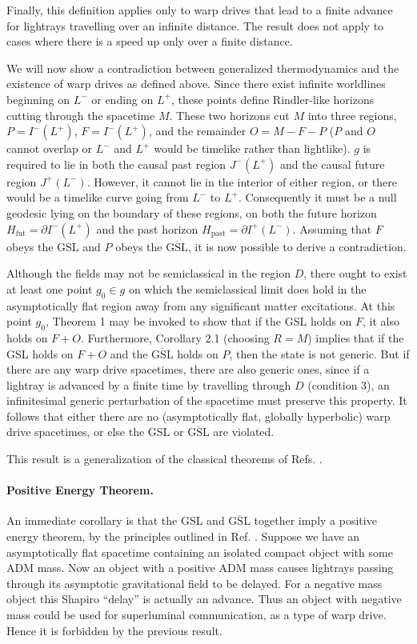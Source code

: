 \documentclass{article}
\begin{document}
Finally, this definition applies only to warp drives that lead to a finite advance for lightrays travelling over an infinite distance.  The result does not apply to cases where there is a speed up only over a finite distance.

We will now show a contradiction between generalized thermodynamics and the existence of warp drives as defined above.  Since there exist infinite worldlines beginning on $L^-$ or ending on $L^+$, these points define Rindler-like horizons cutting through the spacetime $M$.  These two horizons cut $M$ into three regions, $P = I^-(L^+)$, $F = I^-(L^+)$, and the remainder $O = M - F - P$ ($P$ and $O$ cannot overlap or $L^-$ and $L^+$ would be timelike rather than lightlike).  $g$ is required to lie in both the causal past region $J^-(L^+)$ and the causal future region $J^+(L^-)$.  However, it cannot lie in the interior of either region, or there would be a timelike curve going from $L^-$ to $L^+$.  Consequently it must be a null geodesic lying on the boundary of these regions, on both the future horizon $H_\mathrm{fut} = \partial I^-(L^+)$ and the past horizon $H_\mathrm{past} = \partial I^+(L^-)$.  Assuming that $F$ obeys the GSL and $P$ obeys the $\overline{\mathrm{GSL}}$, it is now possible to derive a contradiction.

Although the fields may not be semiclassical in the region $D$, there ought to exist at least one point $g_0 \in g$ on which the semiclassical limit does hold in the asymptotically flat region away from any significant matter excitations.  At this point $g_0$, Theorem 1 may be invoked to show that if the GSL holds on $F$, it also holds on $F + O$.  Furthermore, Corollary 2.1 (choosing $R = M$) implies that if the GSL holds on $F + O$ and the $\overline{\mathrm{GSL}}$ holds on $P$, then the state is not generic.  But if there are any warp drive spacetimes, there are also generic ones, since if a lightray is advanced by a finite time by travelling through $D$ (condition 3), an infinitesimal generic perturbation of the spacetime must preserve this property.  It follows that either there are no (asymptotically flat, globally hyperbolic) warp drive spacetimes, or else the GSL or $\overline{\mathrm{GSL}}$ are violated.

This result is a generalization of the classical theorems of Refs. \cite{olum, supercensor, GW00}.

\paragraph{Positive Energy Theorem.}  An immediate corollary is that the GSL and $\overline{\mathrm{GSL}}$ together imply a positive energy theorem, by the principles outlined in Ref. \cite{SPW}.  Suppose we have an asymptotically flat spacetime containing an isolated compact object with some ADM mass.  Now an object with a positive ADM mass causes lightrays passing through its asymptotic gravitational field to be delayed.  For a negative mass object this Shapiro ``delay'' is actually an advance.  Thus an object with negative mass could be used for superluminal communication, as a type of warp drive.  Hence it is forbidden by the previous result.
\end{document}
